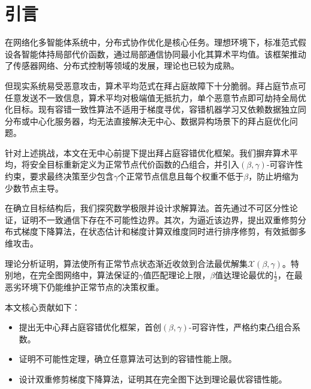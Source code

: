 \chapter{引言}

在网络化多智能体系统中，分布式协作优化是核心任务。理想环境下，标准范式假设各智能体持局部代价函数，通过局部通信协同最小化其算术平均值。该框架推动了传感器网络、分布式控制等领域的发展，理论也已较为成熟。

但现实系统易受恶意攻击，算术平均范式在拜占庭故障下十分脆弱。拜占庭节点可任意发送不一致信息，算术平均对极端值无抵抗力，单个恶意节点即可劫持全局优化目标。现有容错一致性算法不适用于梯度寻优，容错机器学习又依赖数据独立同分布或中心化服务器，均无法直接解决无中心、数据异构场景下的拜占庭优化问题。

针对上述挑战，本文在无中心前提下提出拜占庭容错优化框架。我们摒弃算术平均，将安全目标重新定义为正常节点代价函数的凸组合，并引入$(\beta,\gamma)$-可容许性约束，要求最终决策至少包含$\gamma$个正常节点信息且每个权重不低于$\beta$，防止坍缩为少数节点主导。

在确立目标结构后，我们探究数学极限并设计求解算法。首先通过不可区分性论证，证明不一致通信下存在不可能性边界。其次，为逼近该边界，提出双重修剪分布式梯度下降算法，在状态估计和梯度计算双维度同时进行排序修剪，有效抵御多维攻击。

理论分析证明，算法使所有正常节点状态渐近收敛到合法最优解集$\mathcal{X}(\beta,\gamma)$。特别地，在完全图网络中，算法保证的$\gamma$值匹配理论上限，$\beta$值达理论最优的$\frac{1}{2}$，在最恶劣环境下仍能维护正常节点的决策权重。

本文核心贡献如下：
\begin{itemize}
    \item 提出无中心拜占庭容错优化框架，首创$(\beta,\gamma)$-可容许性，严格约束凸组合系数。
    \item 证明不可能性定理，确立任意算法可达到的容错性能上限。
    \item 设计双重修剪梯度下降算法，证明其在完全图下达到理论最优容错性能。
\end{itemize}